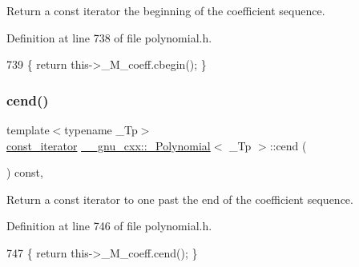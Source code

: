 Return a {\ttfamily const} iterator the beginning of the coefficient sequence. 

Definition at line 738 of file polynomial.\+h.


\begin{DoxyCode}
739       \{ \textcolor{keywordflow}{return} this->\_M\_coeff.cbegin(); \}
\end{DoxyCode}
\mbox{\label{class____gnu__cxx_1_1__Polynomial_ae3d5b393866c55f9585a1e0e10c41cc4}} 
\subsubsection{\texorpdfstring{cend()}{cend()}}
{\footnotesize\ttfamily template$<$typename \+\_\+\+Tp$>$ \\
\hyperlink{class____gnu__cxx_1_1__Polynomial_a96e4523cc2a834724fe4224f0800486b}{const\+\_\+iterator} \hyperlink{class____gnu__cxx_1_1__Polynomial}{\+\_\+\+\_\+gnu\+\_\+cxx\+::\+\_\+\+Polynomial}$<$ \+\_\+\+Tp $>$\+::cend (\begin{DoxyParamCaption}{ }\end{DoxyParamCaption}) const\hspace{0.3cm}{\ttfamily [inline]}, {\ttfamily [noexcept]}}

Return a {\ttfamily const} iterator to one past the end of the coefficient sequence. 

Definition at line 746 of file polynomial.\+h.


\begin{DoxyCode}
747       \{ \textcolor{keywordflow}{return} this->\_M\_coeff.cend(); \}
\end{DoxyCode}
\mbox{\label{class____gnu__cxx_1_1__Polynomial_a7cee31b3acbe8c024af6d696bc610f49}} 
